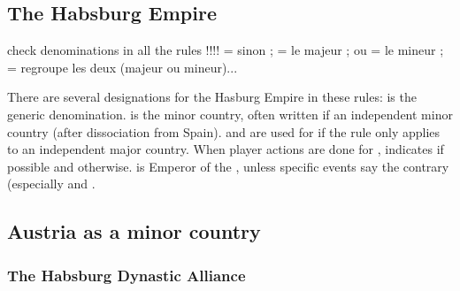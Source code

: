 \label{chSpecific:Austria}

\subsection{The Habsburg Empire}
\begin{todo}
  check denominations in all the rules !!!!  \MAJHAB = \AUS sinon \SPA;
  \AUS = le majeur ; \hab ou  = le mineur ; \HAB =
  regroupe les deux (majeur ou mineur)...
\end{todo}

\aparag There are several designations for the Hasburg Empire in these
rules: \HAB is the generic denomination.  is the minor
country, often written \hab if an independent minor country (after
dissociation from Spain).  and \AUS are used for
\HAB if the rule only applies to an independent major country. When
player actions are done for \MAJHAB, \MAJHAB indicates \AUS if possible and
\SPA otherwise.
\aparag \HAB is Emperor of the \HRE, unless specific events say the
contrary (especially  and
.

\subsection{Austria as a minor country}

\subsubsection{The Habsburg Dynastic Alliance}\label{chSpecific:Habsburg Dynastic Alliance}

